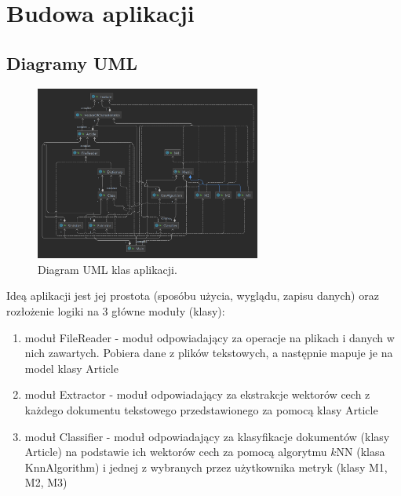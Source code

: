 \documentclass{classrep}
\begin{document}
\section{Budowa aplikacji}
\subsection{Diagramy UML}

\begin{figure}[ht]
\centering
\includegraphics[width=0.66\textwidth]{uml2.png}
\caption{Diagram UML klas aplikacji.}
\label{fig1}
\end{figure}

Ideą aplikacji jest jej prostota (sposóbu użycia, wyglądu, zapisu danych) oraz rozłożenie logiki na 3 główne moduły (klasy): 
\begin{enumerate}
\item moduł FileReader - moduł odpowiadający za operacje na plikach i danych w nich zawartych. Pobiera dane z plików tekstowych, \cite{teksty} a następnie mapuje je na model klasy Article
\item moduł Extractor - moduł odpowiadający za ekstrakcje wektorów cech z każdego dokumentu tekstowego przedstawionego za pomocą klasy Article
\item moduł Classifier - moduł odpowiadający za klasyfikacje dokumentów (klasy Article) na podstawie ich wektorów cech za pomocą algorytmu \(k\)NN \cite{tadeusiewicz90} (klasa KnnAlgorithm) i jednej z wybranych przez użytkownika metryk (klasy M1, M2, M3)
\end{enumerate}
\end{document}
